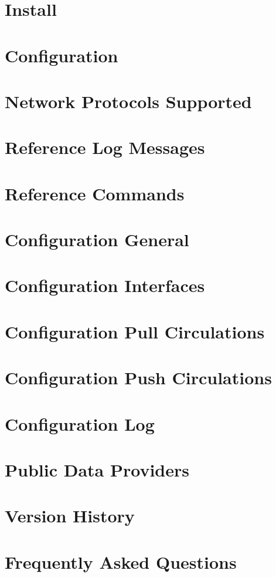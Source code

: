 \documentclass[
	oneside,
	openany,
	a4paper,
	headings=optiontoheadandtoc
	]{book}
\begin{document}
\chapter{Install}

 
\chapter{Configuration}


\chapter{Network Protocols Supported}


\chapter{Reference Log Messages}


\chapter{Reference Commands}


\appendix

\chapter{Configuration General}
 

\chapter{Configuration Interfaces}
 

\chapter{Configuration Pull Circulations}
 

\chapter{Configuration Push Circulations}
 

\chapter{Configuration Log}

 
\chapter{Public Data Providers}


\chapter{Version History}

 
\chapter{Frequently Asked Questions}

	
\end{document}
